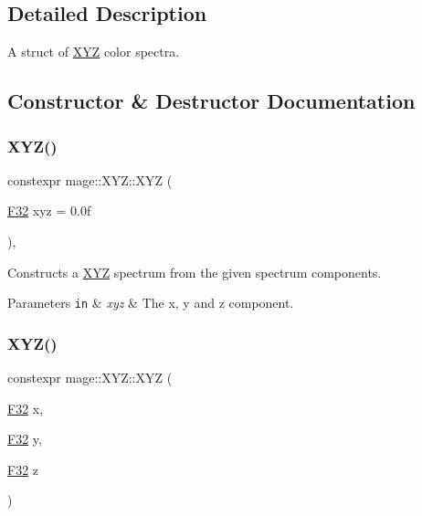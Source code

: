 \subsection{Detailed Description}
A struct of \hyperlink{structmage_1_1_x_y_z}{X\+YZ} color spectra. 

\subsection{Constructor \& Destructor Documentation}
\hypertarget{structmage_1_1_x_y_z_af8b9ef53daa7463097c6397644a24ebf}{}\label{structmage_1_1_x_y_z_af8b9ef53daa7463097c6397644a24ebf} 
\subsubsection{\texorpdfstring{X\+Y\+Z()}{XYZ()}\hspace{0.1cm}{\footnotesize\ttfamily [1/6]}}
{\footnotesize\ttfamily constexpr mage\+::\+X\+Y\+Z\+::\+X\+YZ (\begin{DoxyParamCaption}\item[{\hyperlink{namespacemage_aa97e833b45f06d60a0a9c4fc22ae02c0}{F32}}]{xyz = {\ttfamily 0.0f} }\end{DoxyParamCaption})\hspace{0.3cm}{\ttfamily [explicit]}, {\ttfamily [noexcept]}}

Constructs a \hyperlink{structmage_1_1_x_y_z}{X\+YZ} spectrum from the given spectrum components.


\begin{DoxyParams}[1]{Parameters}
\mbox{\tt in}  & {\em xyz} & The x, y and z component. \\
\hline
\end{DoxyParams}
\hypertarget{structmage_1_1_x_y_z_af1a6e6dd912ef8513640bd7a45af01d5}{}\label{structmage_1_1_x_y_z_af1a6e6dd912ef8513640bd7a45af01d5} 
\subsubsection{\texorpdfstring{X\+Y\+Z()}{XYZ()}\hspace{0.1cm}{\footnotesize\ttfamily [2/6]}}
{\footnotesize\ttfamily constexpr mage\+::\+X\+Y\+Z\+::\+X\+YZ (\begin{DoxyParamCaption}\item[{\hyperlink{namespacemage_aa97e833b45f06d60a0a9c4fc22ae02c0}{F32}}]{x,  }\item[{\hyperlink{namespacemage_aa97e833b45f06d60a0a9c4fc22ae02c0}{F32}}]{y,  }\item[{\hyperlink{namespacemage_aa97e833b45f06d60a0a9c4fc22ae02c0}{F32}}]{z }\end{DoxyParamCaption})\hspace{0.3cm}{\ttfamily [noexcept]}}

